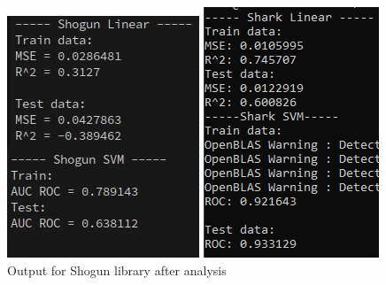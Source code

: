 \begin{figure}[!ht]
	\centering
	\begin{minipage}{0.31\textwidth}
		\centering
		\includegraphics[width=0.75\linewidth]{Rozdzial7/shogun_linear_svm}
		\caption{Output for Shogun library after analysis}
		\label{fig:shogun_linear_svm2}		
	\end{minipage}%
	\hspace{0.02\textwidth}
	\begin{minipage}{0.31\textwidth}
		\centering
		\includegraphics[width=0.65\linewidth]{Rozdzial7/shark_linear_svm}

\end{minipage}
\end{figure}
